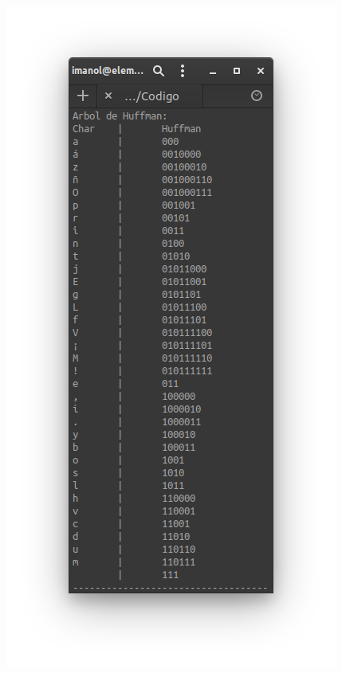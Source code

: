 \begin{itemize}
\begin{figure}[h!]
                    \includegraphics[scale=.5]{Huffman/ejemplos/ejemplo3/ej3-reph.png}
                \end{figure}
                \newpage
        \end{itemize}
